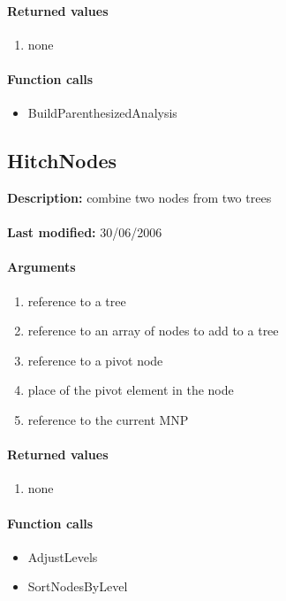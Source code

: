 \paragraph{Returned values}
\begin{enumerate}
\item none
\end{enumerate}

\paragraph{Function calls}
\begin{itemize}
\item BuildParenthesizedAnalysis
\end{itemize}

\subsection{HitchNodes}
\textbf{Description:} combine two nodes from two trees\\
\\\textbf{Last modified:} 30/06/2006

\paragraph{Arguments}
\begin{enumerate}
\item reference to a tree
\item reference to an array of nodes to add to a tree
\item reference to a pivot node
\item place of the pivot element in the node
\item reference to the current MNP
\end{enumerate}

\paragraph{Returned values}
\begin{enumerate}
\item none
\end{enumerate}

\paragraph{Function calls}
\begin{itemize}
\item AdjustLevels
\item SortNodesByLevel
\end{itemize}

